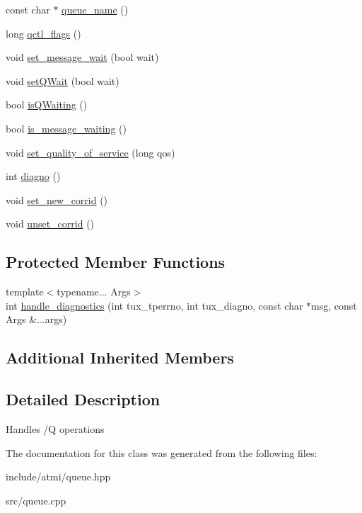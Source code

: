 \begin{DoxyCompactItemize}
const char $\ast$ \hyperlink{group__atmi_gadaddc33c75ec6e13f6c57da8d979ad32}{queue\+\_\+name} ()
\item 
long \hyperlink{group__atmi_ga96f51996c857985c9b8e1b720f726f0c}{qctl\+\_\+flags} ()
\item 
void \hyperlink{group__atmi_ga9669776889226a450093d2ddfd921d4b}{set\+\_\+message\+\_\+wait} (bool wait)
\item 
void \hyperlink{group__atmi_ga223fac7945fb8d87f04189aa77ce666a}{set\+Q\+Wait} (bool wait)
\item 
bool \hyperlink{group__atmi_ga90f5a71979755634b1e625d45ac61412}{is\+Q\+Waiting} ()
\item 
bool \hyperlink{group__atmi_gac655db1db167f3e833f4fa84e6256428}{is\+\_\+message\+\_\+waiting} ()
\item 
void \hyperlink{group__atmi_ga0fbca137aadc2946b8f3889b76352af9}{set\+\_\+quality\+\_\+of\+\_\+service} (long qos)
\item 
int \hyperlink{group__atmi_ga1fabff1d9a56389a41f92542561d570d}{diagno} ()
\item 
void \hyperlink{group__atmi_ga2c0511c9f17e939789c5290fe83d1f1f}{set\+\_\+new\+\_\+corrid} ()
\item 
void \hyperlink{group__atmi_gaa74de8091c32580972e7871e7ddf786c}{unset\+\_\+corrid} ()
\end{DoxyCompactItemize}
\subsection*{Protected Member Functions}
\begin{DoxyCompactItemize}
\item 
{\footnotesize template$<$typename... Args$>$ }\\int \hyperlink{group__atmi_ga767f80e22a52d4b325d5a5aadc27a343}{handle\+\_\+diagnostics} (int tux\+\_\+tperrno, int tux\+\_\+diagno, const char $\ast$msg, const Args \&...args)
\end{DoxyCompactItemize}
\subsection*{Additional Inherited Members}


\subsection{Detailed Description}
Handles /\+Q operations 

The documentation for this class was generated from the following files\+:\begin{DoxyCompactItemize}
\item 
include/atmi/queue.\+hpp\item 
src/queue.\+cpp\end{DoxyCompactItemize}
